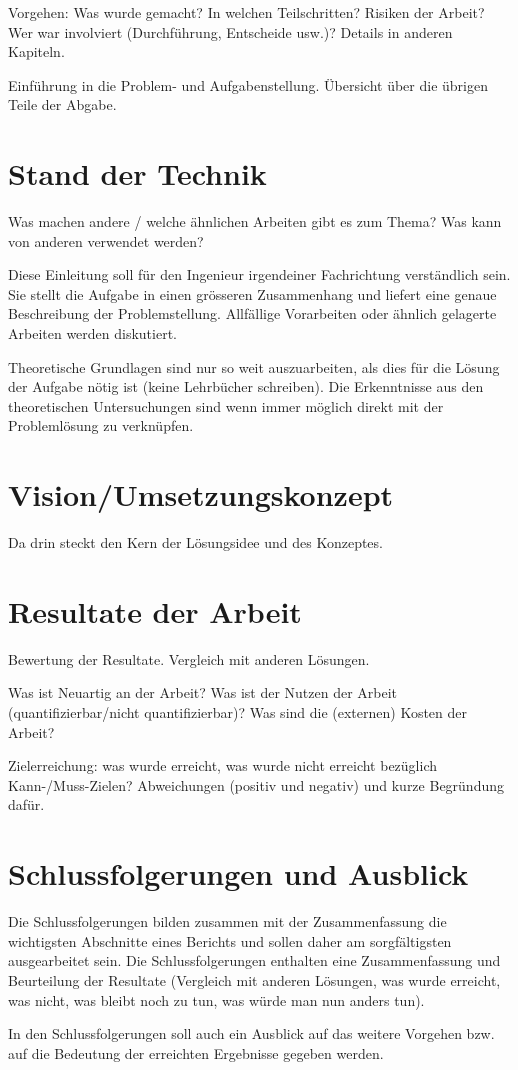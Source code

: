 Vorgehen: Was wurde gemacht? In welchen Teilschritten? Risiken der Arbeit? Wer war involviert (Durchführung, Entscheide usw.)? Details in anderen Kapiteln.

Einführung in die Problem- und Aufgabenstellung. Übersicht über die übrigen Teile der Abgabe.

\section{Stand der Technik}

Was machen andere / welche ähnlichen Arbeiten gibt es zum Thema? Was kann von anderen verwendet werden?

Diese Einleitung soll für den Ingenieur irgendeiner Fachrichtung verständlich sein. Sie stellt die Aufgabe in einen grösseren Zusammenhang und liefert eine genaue Beschreibung der Problemstellung. Allfällige Vorarbeiten oder ähnlich gelagerte Arbeiten werden diskutiert. 

Theoretische Grundlagen sind nur so weit auszuarbeiten, als dies für die Lösung der Aufgabe nötig ist (keine Lehrbücher schreiben). Die Erkenntnisse aus den theoretischen Untersuchungen sind wenn immer möglich direkt mit der Problemlösung zu verknüpfen.

\section{Vision/Umsetzungskonzept}

Da drin steckt den Kern der Lösungsidee und des Konzeptes.

\section{Resultate der Arbeit}

Bewertung der Resultate. Vergleich mit anderen Lösungen. 

Was ist Neuartig an der Arbeit? Was ist der Nutzen der Arbeit (quantifizierbar/nicht quantifizierbar)? Was sind die (externen) Kosten der Arbeit?

Zielerreichung: was wurde erreicht, was wurde nicht erreicht bezüglich Kann-/Muss-Zielen? Abweichungen (positiv und negativ) und kurze Begründung dafür.

\section{Schlussfolgerungen und Ausblick}

Die Schlussfolgerungen bilden zusammen mit der Zusammenfassung die wichtigsten Abschnitte eines Berichts und sollen daher am sorgfältigsten ausgearbeitet sein. Die Schlussfolgerungen enthalten eine Zusammenfassung und Beurteilung der Resultate (Vergleich mit anderen Lösungen, was wurde erreicht, was nicht, was bleibt noch zu tun, was würde man nun anders tun).
 
In den Schlussfolgerungen soll auch ein Ausblick auf das weitere Vorgehen bzw. auf die Bedeutung der erreichten Ergebnisse gegeben werden.